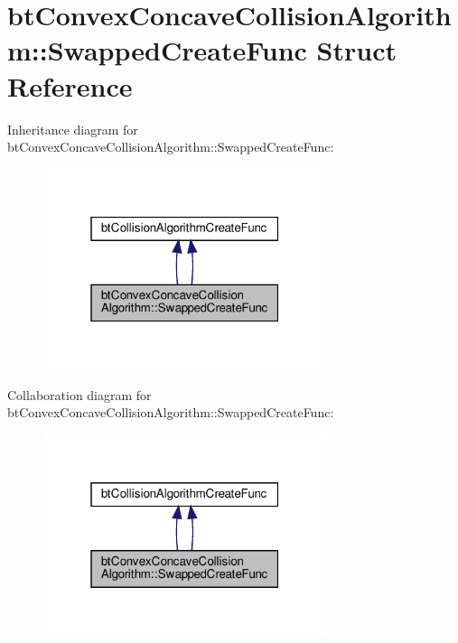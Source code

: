 \hypertarget{structbtConvexConcaveCollisionAlgorithm_1_1SwappedCreateFunc}{}\section{bt\+Convex\+Concave\+Collision\+Algorithm\+:\+:Swapped\+Create\+Func Struct Reference}
\label{structbtConvexConcaveCollisionAlgorithm_1_1SwappedCreateFunc}


Inheritance diagram for bt\+Convex\+Concave\+Collision\+Algorithm\+:\+:Swapped\+Create\+Func\+:
\nopagebreak
\begin{figure}[H]
\begin{center}
\leavevmode
\includegraphics[width=235pt]{structbtConvexConcaveCollisionAlgorithm_1_1SwappedCreateFunc__inherit__graph}
\end{center}
\end{figure}


Collaboration diagram for bt\+Convex\+Concave\+Collision\+Algorithm\+:\+:Swapped\+Create\+Func\+:
\nopagebreak
\begin{figure}[H]
\begin{center}
\leavevmode
\includegraphics[width=235pt]{structbtConvexConcaveCollisionAlgorithm_1_1SwappedCreateFunc__coll__graph}
\end{center}
\end{figure}
